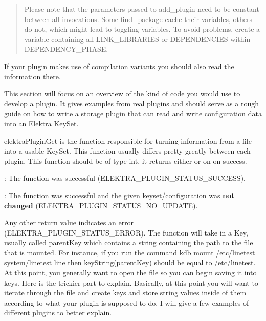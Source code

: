 \begin{quote}
Please note that the parameters passed to {\ttfamily add\+\_\+plugin} need to be constant between all invocations. Some {\ttfamily find\+\_\+package} cache their variables, others do not, which might lead to toggling variables. To avoid problems, create a variable containing all {\ttfamily L\+I\+N\+K\+\_\+\+L\+I\+B\+R\+A\+R\+I\+ES} or {\ttfamily D\+E\+P\+E\+N\+D\+E\+N\+C\+I\+ES} within {\ttfamily D\+E\+P\+E\+N\+D\+E\+N\+C\+Y\+\_\+\+P\+H\+A\+SE}. \end{quote}


If your plugin makes use of \hyperlink{doc_tutorials_compilation-variants_md}{compilation variants} you should also read the information there.

This section will focus on an overview of the kind of code you would use to develop a plugin. It gives examples from real plugins and should serve as a rough guide on how to write a storage plugin that can read and write configuration data into an Elektra {\ttfamily Key\+Set}.

{\ttfamily elektra\+Plugin\+Get} is the function responsible for turning information from a file into a usable {\ttfamily Key\+Set}. This function usually differs pretty greatly between each plugin. This function should be of type {\ttfamily int}, it returns either {} or on {} on success.


\begin{DoxyItemize}
\item {}\+: The function was successful ({\ttfamily E\+L\+E\+K\+T\+R\+A\+\_\+\+P\+L\+U\+G\+I\+N\+\_\+\+S\+T\+A\+T\+U\+S\+\_\+\+S\+U\+C\+C\+E\+SS}).
\item {}\+: The function was successful and the given keyset/configuration was {\bfseries not changed} ({\ttfamily E\+L\+E\+K\+T\+R\+A\+\_\+\+P\+L\+U\+G\+I\+N\+\_\+\+S\+T\+A\+T\+U\+S\+\_\+\+N\+O\+\_\+\+U\+P\+D\+A\+TE}).
\end{DoxyItemize}

Any other return value indicates an error ({\ttfamily E\+L\+E\+K\+T\+R\+A\+\_\+\+P\+L\+U\+G\+I\+N\+\_\+\+S\+T\+A\+T\+U\+S\+\_\+\+E\+R\+R\+OR}). The function will take in a {\ttfamily Key}, usually called {\ttfamily parent\+Key} which contains a string containing the path to the file that is mounted. For instance, if you run the command {\ttfamily kdb mount /etc/linetest system/linetest line} then {\ttfamily key\+String(parent\+Key)} should be equal to {\ttfamily /etc/linetest}. At this point, you generally want to open the file so you can begin saving it into keys. Here is the trickier part to explain. Basically, at this point you will want to iterate through the file and create keys and store string values inside of them according to what your plugin is supposed to do. I will give a few examples of different plugins to better explain.

